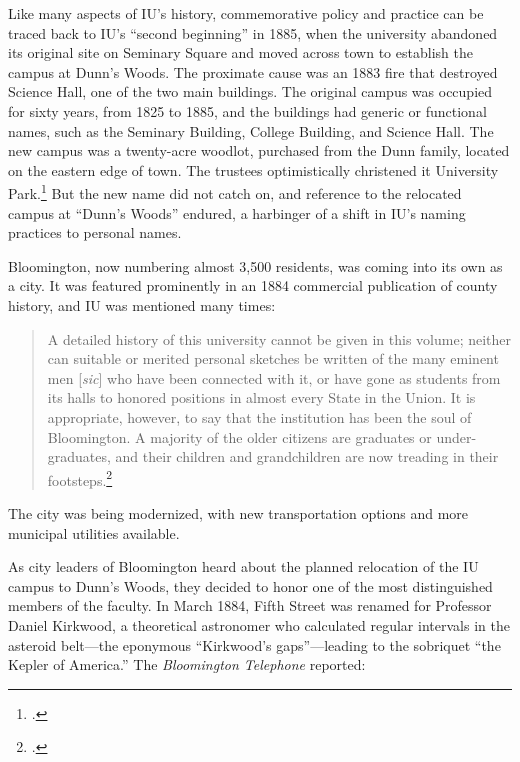 \documentclass[
  american,
  letterpaper,
]{scrreprt}
\begin{document}
Like many aspects of IU's history, commemorative policy and practice can
be traced back to IU's ``second beginning'' in 1885, when the university
abandoned its original site on Seminary Square and moved across town to
establish the campus at Dunn's Woods. The proximate cause was an 1883
fire that destroyed Science Hall, one of the two main buildings. The
original campus was occupied for sixty years, from 1825 to 1885, and the
buildings had generic or functional names, such as the Seminary
Building, College Building, and Science Hall. The new campus was a
twenty-acre woodlot, purchased from the Dunn family, located on the
eastern edge of town. The trustees optimistically christened it
University Park.\footnote{.} But the new name did not
catch on, and reference to the relocated campus at ``Dunn's Woods''
endured, a harbinger of a shift in IU's naming practices to personal
names.

Bloomington, now numbering almost 3,500 residents, was coming into its
own as a city. It was featured prominently in an 1884 commercial
publication of county history, and IU was mentioned many times:

\begin{quote}
A detailed history of this university cannot be given in this volume;
neither can suitable or merited personal sketches be written of the many
eminent men {[}\emph{sic}{]} who have been connected with it, or have
gone as students from its halls to honored positions in almost every
State in the Union. It is appropriate, however, to say that the
institution has been the soul of Bloomington. A majority of the older
citizens are graduates or under-graduates, and their children and
grandchildren are now treading in their footsteps.\footnote{.}
\end{quote}

The city was being modernized, with new transportation options and more
municipal utilities available.

As city leaders of Bloomington heard about the planned relocation of the
IU campus to Dunn's Woods, they decided to honor one of the most
distinguished members of the faculty. In March 1884, Fifth Street was
renamed for Professor Daniel Kirkwood, a theoretical astronomer who
calculated regular intervals in the asteroid belt---the eponymous
``Kirkwood's gaps''---leading to the sobriquet ``the Kepler of
America.'' The \emph{Bloomington Telephone} reported:
\end{document}
